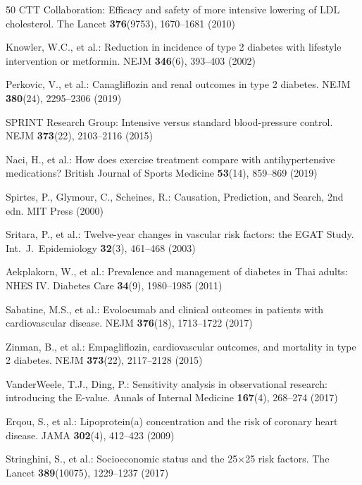 \documentclass[runningheads]{llncs}
\begin{document}
\begin{thebibliography}{50}
CTT Collaboration:
Efficacy and safety of more intensive lowering of LDL cholesterol.
The Lancet \textbf{376}(9753), 1670--1681 (2010)

Knowler, W.C., et al.:
Reduction in incidence of type 2 diabetes with lifestyle intervention or metformin.
NEJM \textbf{346}(6), 393--403 (2002)

Perkovic, V., et al.:
Canagliflozin and renal outcomes in type 2 diabetes.
NEJM \textbf{380}(24), 2295--2306 (2019)

SPRINT Research Group:
Intensive versus standard blood-pressure control.
NEJM \textbf{373}(22), 2103--2116 (2015)

Naci, H., et al.:
How does exercise treatment compare with antihypertensive medications?
British Journal of Sports Medicine \textbf{53}(14), 859--869 (2019)

Spirtes, P., Glymour, C., Scheines, R.:
Causation, Prediction, and Search, 2nd edn.
MIT Press (2000)

Sritara, P., et al.:
Twelve-year changes in vascular risk factors: the EGAT Study.
Int.\ J.\ Epidemiology \textbf{32}(3), 461--468 (2003)

Aekplakorn, W., et al.:
Prevalence and management of diabetes in Thai adults: NHES IV.
Diabetes Care \textbf{34}(9), 1980--1985 (2011)

Sabatine, M.S., et al.:
Evolocumab and clinical outcomes in patients with cardiovascular disease.
NEJM \textbf{376}(18), 1713--1722 (2017)

Zinman, B., et al.:
Empagliflozin, cardiovascular outcomes, and mortality in type 2 diabetes.
NEJM \textbf{373}(22), 2117--2128 (2015)

VanderWeele, T.J., Ding, P.:
Sensitivity analysis in observational research: introducing the E-value.
Annals of Internal Medicine \textbf{167}(4), 268--274 (2017)

Erqou, S., et al.:
Lipoprotein(a) concentration and the risk of coronary heart disease.
JAMA \textbf{302}(4), 412--423 (2009)

Stringhini, S., et al.:
Socioeconomic status and the 25$\times$25 risk factors.
The Lancet \textbf{389}(10075), 1229--1237 (2017)


\end{thebibliography}
\end{document}
